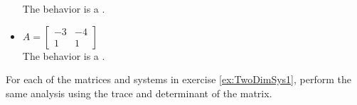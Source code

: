 \documentclass{ximera}
\begin{document}
\begin{exercise}
\begin{itemize}
        The behavior is a  .
        \item $A = \begin{bmatrix} -3 & -4 \\ 1 & 1 \end{bmatrix}$\\
        The behavior is a  .
    \end{itemize}
\end{exercise}

\begin{exercise}
For each of the matrices and systems in exercise \ref{ex:TwoDimSys1}, perform the same analysis using the trace and determinant of the matrix.
\end{exercise}
\end{document}
